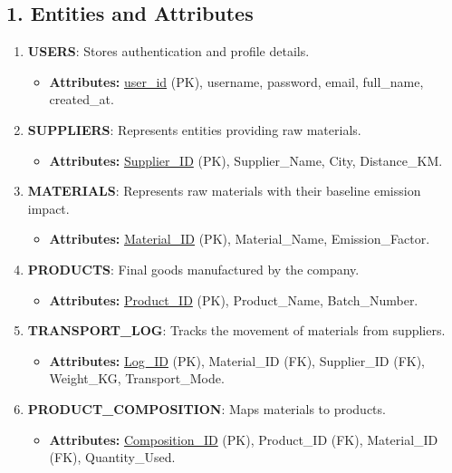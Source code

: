 \documentclass[12pt,a4paper]{article}
\begin{document}
\subsection*{1. Entities and Attributes}

\begin{enumerate}
    \item \textbf{USERS}: Stores authentication and profile details.
    \begin{itemize}
        \item \textbf{Attributes:} \underline{user\_id} (PK), username, password, email, full\_name, created\_at.
    \end{itemize}
    
    \item \textbf{SUPPLIERS}: Represents entities providing raw materials.
    \begin{itemize}
        \item \textbf{Attributes:} \underline{Supplier\_ID} (PK), Supplier\_Name, City, Distance\_KM.
    \end{itemize}
    
    \item \textbf{MATERIALS}: Represents raw materials with their baseline emission impact.
    \begin{itemize}
        \item \textbf{Attributes:} \underline{Material\_ID} (PK), Material\_Name, Emission\_Factor.
    \end{itemize}
    
    \item \textbf{PRODUCTS}: Final goods manufactured by the company.
    \begin{itemize}
        \item \textbf{Attributes:} \underline{Product\_ID} (PK), Product\_Name, Batch\_Number.
    \end{itemize}
    
    \item \textbf{TRANSPORT\_LOG}: Tracks the movement of materials from suppliers.
    \begin{itemize}
        \item \textbf{Attributes:} \underline{Log\_ID} (PK), Material\_ID (FK), Supplier\_ID (FK), Weight\_KG, Transport\_Mode.
    \end{itemize}
    
    \item \textbf{PRODUCT\_COMPOSITION}: Maps materials to products.
    \begin{itemize}
        \item \textbf{Attributes:} \underline{Composition\_ID} (PK), Product\_ID (FK), Material\_ID (FK), Quantity\_Used.
    \end{itemize}
\end{enumerate}
\end{document}
